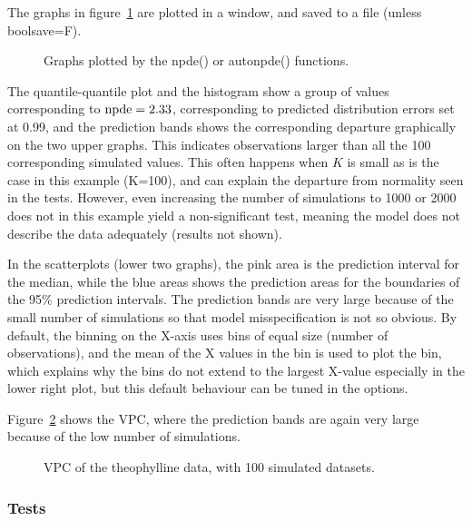 \hskip 18pt The graphs in figure~\ref{fig:respde} are plotted in a window, and saved to a file (unless {\sf boolsave=F}).
\begin{figure}[!h]
\par\kern -0.3cm
\begin{center}
\end{center}
\caption{Graphs plotted by the {\sf npde()} or {\sf autonpde()}
functions.}\label{fig:respde}
\end{figure}
The quantile-quantile plot and the histogram show a group of values corresponding to ${\rm npde}=2.33$, corresponding to predicted distribution errors set at 0.99, and the prediction bands shows the corresponding departure graphically on the two upper graphs. This indicates observations larger than all the 100 corresponding simulated values. This often happens when $K$ is small as is the case in this example (K=100), and can explain the departure from normality seen in the tests. However, even increasing the number of simulations to 1000 or 2000 does not in this example yield a non-significant test, meaning the model does not describe the data adequately (results not shown).

In the scatterplots (lower two graphs), the pink area is the prediction interval for the median, while the blue areas shows the prediction areas for the boundaries of the 95\% prediction intervals. The prediction bands are very large because of the small number of simulations so that model misspecification is not so obvious. By default, the binning on the X-axis uses bins of equal size (number of observations), and the mean of the X values in the bin is used to plot the bin, which explains why the bins do not extend to the largest X-value especially in the lower right plot, but this default behaviour can be tuned in the options.

Figure~\ref{fig:theovpc} shows the VPC, where the prediction bands are again very large because of the low number of simulations.
\begin{figure}[!h]
\par\kern -0.3cm
\begin{center}
\end{center}
\caption{VPC of the theophylline data, with 100 simulated datasets.}\label{fig:theovpc}
\end{figure}

\newpage
\subsubsection{Tests}

